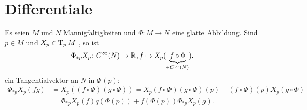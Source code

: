 
\section{Differentiale}


Es seien $M$ und $N$ Mannigfaltigkeiten und $\Phi \colon M \to N$ eine glatte Abbildung.
Sind $p \in M$ und $X_p \in \operatorname{T}_pM$ , so ist 
\begin{align*}
  \Phi_{*p}X_p \colon C^{\infty}(N) \to \operatorname{\mathbb{R}}, f \mapsto X_p(\underbrace{f \circ \Phi}_{\in C^{\infty}(N)}).
\end{align*}
ein Tangentialvektor an $N$ in $\Phi(p)$:
\begin{align*}
  \Phi_{*p}X_p(fg) & = X_p((f \circ \Phi)(g \circ \Phi)) = X_p(f \circ \Phi)(g \circ \Phi)(p) + (f \circ \Phi)(p)X_p(g \circ \Phi)\\
  & = \Phi_{*p}X_p(f)q(\Phi(p)) + f(\Phi(p)) \Phi_{*p}X_p(g).
\end{align*}
